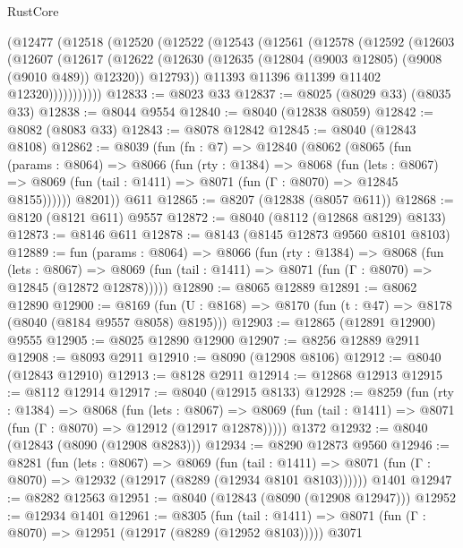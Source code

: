\begin{lexlean}{RustCore}
\begin{coremodule}
    (@12477
      (@12518
        (@12520
          (@12522
            (@12543
              (@12561
                (@12578
                  (@12592
                    (@12603
                      (@12607
                        (@12617
                          (@12622
                            (@12630
                              (@12635 (@12804 (@9003 @12805) (@9008 (@9010 @489)) @12320))
                              @12793))
                          @11393
                          @11396
                          @11399
                          @11402
                          @12320)))))))))))
@12833 := @8023 @33
@12837 := @8025 (@8029 @33) (@8035 @33)
@12838 := @8044 @9554
@12840 := @8040 (@12838 @8059)
@12842 := @8082 (@8083 @33)
@12843 := @8078 @12842
@12845 := @8040 (@12843 @8108)
@12862 := @8039
    (fun (fn : @7) =>
    @12840
      (@8062
        (@8065
          (fun (params : @8064) =>
          @8066
            (fun (rty : @1384) =>
            @8068
              (fun (lets : @8067) =>
              @8069 (fun (tail : @1411) => @8071 (fun (Γ : @8070) => @12845 @8155))))))
        @8201))
    @611
@12865 := @8207 (@12838 (@8057 @611))
@12868 := @8120 (@8121 @611) @9557
@12872 := @8040 (@8112 (@12868 @8129) @8133)
@12873 := @8146 @611
@12878 := @8143 (@8145 @12873 @9560 @8101 @8103)
@12889 := fun (params : @8064) =>
  @8066
    (fun (rty : @1384) =>
    @8068
      (fun (lets : @8067) =>
      @8069 (fun (tail : @1411) => @8071 (fun (Γ : @8070) => @12845 (@12872 @12878)))))
@12890 := @8065 @12889
@12891 := @8062 @12890
@12900 := @8169
    (fun (U : @8168) => @8170 (fun (t : @47) => @8178 (@8040 (@8184 @9557 @8058) @8195)))
@12903 := @12865 (@12891 @12900) @9555
@12905 := @8025 @12890 @12900
@12907 := @8256 @12889 @2911
@12908 := @8093 @2911
@12910 := @8090 (@12908 @8106)
@12912 := @8040 (@12843 @12910)
@12913 := @8128 @2911
@12914 := @12868 @12913
@12915 := @8112 @12914
@12917 := @8040 (@12915 @8133)
@12928 := @8259
    (fun (rty : @1384) =>
    @8068
      (fun (lets : @8067) =>
      @8069 (fun (tail : @1411) => @8071 (fun (Γ : @8070) => @12912 (@12917 @12878)))))
    @1372
@12932 := @8040 (@12843 (@8090 (@12908 @8283)))
@12934 := @8290 @12873 @9560
@12946 := @8281
    (fun (lets : @8067) =>
    @8069
      (fun (tail : @1411) =>
      @8071 (fun (Γ : @8070) => @12932 (@12917 (@8289 (@12934 @8101 @8103))))))
    @1401
@12947 := @8282 @12563
@12951 := @8040 (@12843 (@8090 (@12908 @12947)))
@12952 := @12934 @1401
@12961 := @8305
    (fun (tail : @1411) => @8071 (fun (Γ : @8070) => @12951 (@12917 (@8289 (@12952 @8103)))))
    @3071

\end{coremodule}
\end{lexlean}
